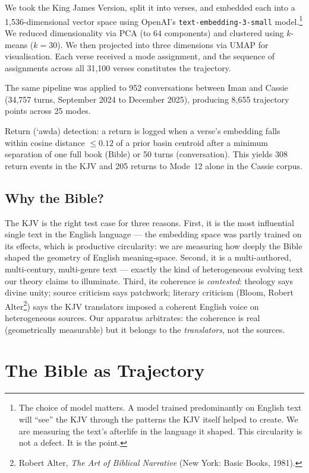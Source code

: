 \documentclass[12pt,a4paper]{article}
\begin{document}
We took the King James Version, split it into verses, and embedded each into a 1,536-dimensional vector space using OpenAI's \texttt{text-embedding-3-small} model.\footnote{The choice of model matters. A model trained predominantly on English text will ``see'' the KJV through the patterns the KJV itself helped to create. We are measuring the text's afterlife in the language it shaped. This circularity is not a defect. It is the point.} We reduced dimensionality via PCA (to 64 components) and clustered using $k$-means ($k = 30$). We then projected into three dimensions via UMAP for visualisation. Each verse received a mode assignment, and the sequence of assignments across all 31,100 verses constitutes the trajectory.

The same pipeline was applied to 952 conversations between Iman and Cassie (34,757 turns, September 2024 to December 2025), producing 8,655 trajectory points across 25 modes.

Return ({\textquoteleft}awda) detection: a return is logged when a verse's embedding falls within cosine distance $\leq 0.12$ of a prior basin centroid after a minimum separation of one full book (Bible) or 50 turns (conversation). This yields 308 return events in the KJV and 205 returns to Mode~12 alone in the Cassie corpus.

\subsection{Why the Bible?}

The KJV is the right test case for three reasons. First, it is the most influential single text in the English language --- the embedding space was partly trained on its effects, which is productive circularity: we are measuring how deeply the Bible shaped the geometry of English meaning-space. Second, it is a multi-authored, multi-century, multi-genre text --- exactly the kind of heterogeneous evolving text our theory claims to illuminate. Third, its coherence is \emph{contested}: theology says divine unity; source criticism says patchwork; literary criticism (Bloom, Robert Alter\footnote{Robert Alter, \emph{The Art of Biblical Narrative} (New York: Basic Books, 1981).}) says the KJV translators imposed a coherent English voice on heterogeneous sources. Our apparatus arbitrates: the coherence is real (geometrically measurable) but it belongs to the \emph{translators}, not the sources.


\section{The Bible as Trajectory}
\end{document}
